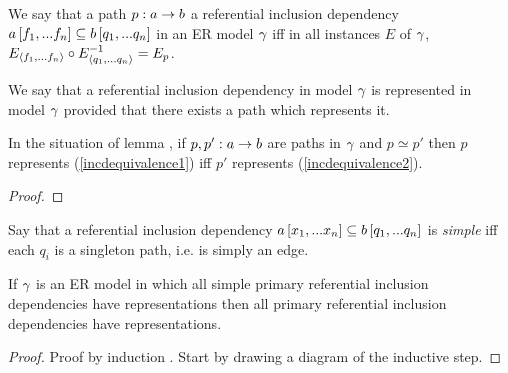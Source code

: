 \begin{definition}
We say that a path $p:a \rightarrow b$  a referential inclusion dependency
$a\left[f_1,...f_n\right]\subseteq b\left[q_1,...q_n\right]$  in an ER model $\gamma$ iff
  in all instances $E$ of $\gamma$, $E_{\langle f_1,...f_n\rangle} \circ E_{\langle q_1,...q_n\rangle}^{-1}=E_p$.
\end{definition}
We say that a referential inclusion dependency in model $\gamma$ is represented in model $\gamma$ provided that there exists a path which represents it. 

\begin{lemma}
In the situation of lemma , if $p,p':a \rightarrow b$
are paths in $\gamma$ and $p \simeq p'$ then $p$ represents (\ref{incdequivalence1})
iff $p'$ represents (\ref{incdequivalence2}). 
\end{lemma}
\begin{proof}
\tbd
\end{proof}
\iffalse
\begin{categoricalaside}
If an ER schema is represented as a category with finite products (\textit{a la} Johnstone \textit{et al}) then
a referential inclusion dependency is a diagram
\begin{center}
$
\begin{array}{cp{0.75cm}c}
   \Rnode{a}{a}     & & \Rnode{x}{x}  \\[1.2cm]     
	                  & & \Rnode{b}{b}  
\end{array}
$
\ncarr{a}{x} 
\alabel{f}[0.33]
\ncarr{b}{x}
\blabel{m}[0.3]
\idcomp
\end{center}
\noindent
in \cat{C} such that in all instance functors $F$, 
$F(f)$ factors through $F(m)$.

Such a referential inclusion dependency is explicitly represented iff
 $f$ factors through $m$ i.e. there is an $f_0: a \morph b$ in \cat{C} such that 
$f_0 \circ m =f$. Note that because $m$ is monic then such an $f_0$ is the unique such morphism and if in some instance $F$,
$e: F(a) \morph F(b)$ is a function such that $e \circ F(m) = F(f)$ then $F(f_0)=e$. 
\end{categoricalaside}
\fi


\begin{definition}
Say that a referential inclusion dependency $a\left[x_1,...x_n\right]\subseteq b\left[q_1,...q_n\right]$ is \textit{simple}
iff each $q_i$ is a singleton path, i.e. is simply an edge. 
\end{definition}

\begin{lemma}
If  $\gamma$ is an ER model in which all simple primary referential inclusion dependencies
have representations then all primary referential inclusion dependencies have representations. 
\end{lemma}
\begin{proof}
Proof by induction \tbd. Start by drawing a diagram of the inductive step.
\end{proof}


